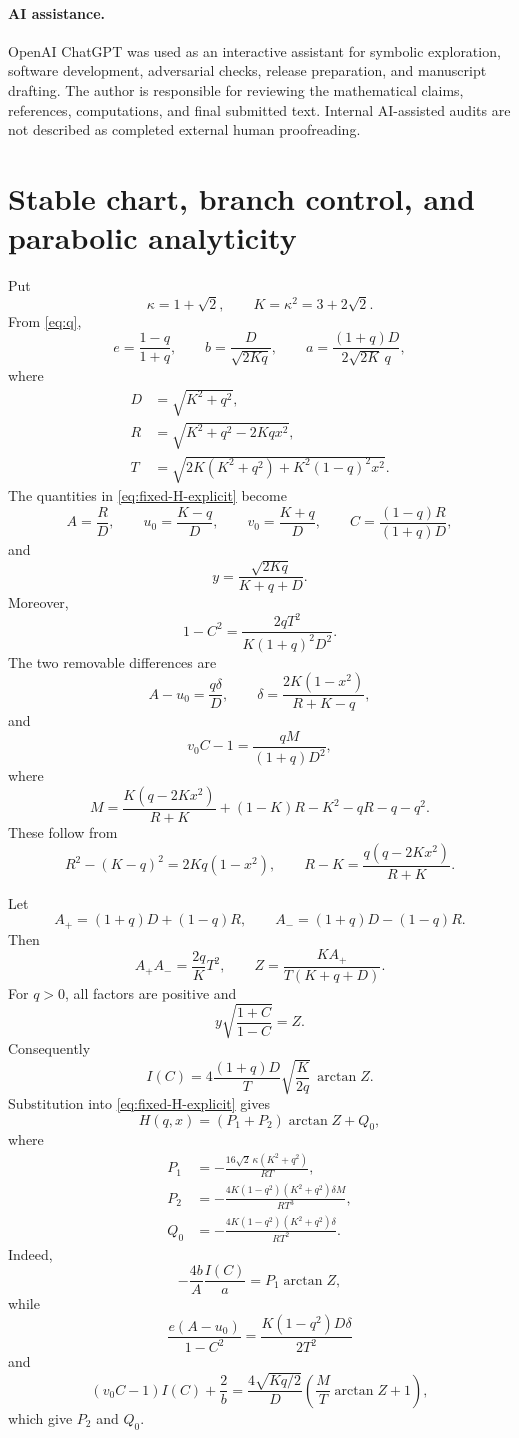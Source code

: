 \documentclass[11pt]{article}
\numberwithin{equation}{section}
\theoremstyle{remark}
\begin{document}
\paragraph{AI assistance.}
OpenAI ChatGPT was used as an interactive assistant for symbolic exploration,
software development, adversarial checks, release preparation, and manuscript
drafting.  The author is responsible for reviewing the mathematical claims,
references, computations, and final submitted text.  Internal AI-assisted audits
are not described as completed external human proofreading.

\appendix

\section{Stable chart, branch control, and parabolic analyticity}
\label{app:q-chart}

Put
\[
  \kappa=1+\sqrt2,
  \qquad K=\kappa^2=3+2\sqrt2.
\]
From \eqref{eq:q},
\[
  e=\frac{1-q}{1+q},
  \qquad
  b=\frac D{\sqrt{2Kq}},
  \qquad
  a=\frac{(1+q)D}{2\sqrt{2K}\,q},
\]
where
\begin{align*}
  D&=\sqrt{K^2+q^2},\\
  R&=\sqrt{K^2+q^2-2Kqx^2},\\
  T&=\sqrt{2K(K^2+q^2)+K^2(1-q)^2x^2}.
\end{align*}
The quantities in \eqref{eq:fixed-H-explicit} become
\[
  A=\frac RD,
  \qquad
  u_0=\frac{K-q}{D},
  \qquad
  v_0=\frac{K+q}{D},
  \qquad
  C=\frac{(1-q)R}{(1+q)D},
\]
and
\[
  y=\frac{\sqrt{2Kq}}{K+q+D}.
\]
Moreover,
\[
  1-C^2=\frac{2qT^2}{K(1+q)^2D^2}.
\]
The two removable differences are
\[
  A-u_0=\frac{q\delta}{D},
  \qquad
  \delta=\frac{2K(1-x^2)}{R+K-q},
\]
and
\[
  v_0C-1=\frac{qM}{(1+q)D^2},
\]
where
\[
  M=\frac{K(q-2Kx^2)}{R+K}+(1-K)R-K^2-qR-q-q^2.
\]
These follow from
\[
  R^2-(K-q)^2=2Kq(1-x^2),
  \qquad
  R-K=\frac{q(q-2Kx^2)}{R+K}.
\]

Let
\[
  A_+=(1+q)D+(1-q)R,
  \qquad
  A_-=(1+q)D-(1-q)R.
\]
Then
\[
  A_+A_-=\frac{2q}{K}T^2,
  \qquad
  Z=\frac{KA_+}{T(K+q+D)}.
\]
For \(q>0\), all factors are positive and
\[
  y\sqrt{\frac{1+C}{1-C}}=Z.
\]
Consequently
\[
  I(C)=4\frac{(1+q)D}{T}\sqrt{\frac K{2q}}\,\arctan Z.
\]
Substitution into \eqref{eq:fixed-H-explicit} gives
\begin{equation}
  H(q,x)=(P_1+P_2)\arctan Z+Q_0,
  \label{eq:stable-H}
\end{equation}
where
\begin{align*}
  P_1&=-\frac{16\sqrt2\,\kappa(K^2+q^2)}{RT},\\
  P_2&=-\frac{4K(1-q^2)(K^2+q^2)\delta M}{RT^3},\\
  Q_0&=-\frac{4K(1-q^2)(K^2+q^2)\delta}{RT^2}.
\end{align*}
Indeed,
\[
  -\frac{4b}{A}\frac{I(C)}a=P_1\arctan Z,
\]
while
\[
  \frac{e(A-u_0)}{1-C^2}=\frac{K(1-q^2)D\delta}{2T^2}
\]
and
\[
  (v_0C-1)I(C)+\frac2b
  =\frac{4\sqrt{Kq/2}}D\left(\frac MT\arctan Z+1\right),
\]
which give \(P_2\) and \(Q_0\).
\end{document}
